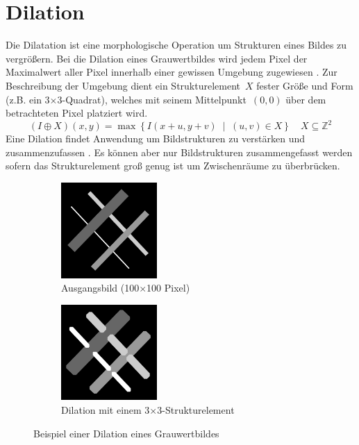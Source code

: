 \section{Dilation}
\writtenby{\dcauthornameewie}%
Die Dilatation ist eine morphologische Operation um Strukturen eines Bildes zu vergrößern.
Bei die Dilation eines Grauwertbildes wird jedem Pixel der Maximalwert aller Pixel innerhalb einer gewissen Umgebung zugewiesen \cite[3.5]{steinmueller2008}.
Zur Beschreibung der Umgebung dient ein Strukturelement~$X$ fester Größe und Form (z.B. ein 3$\times$3-Quadrat), welches mit seinem Mittelpunkt~$(0,0)$ über dem betrachteten Pixel platziert wird.
\begin{equation}
  (I\oplus X)(x,y)= \max \left\{ I(x+u,y+v) \;\middle|\; (u,v) \in X \right\} \quad X \subseteq \mathbb{Z}^2
\end{equation}
Eine Dilation findet Anwendung um Bildstrukturen zu verstärken und zusammenzufassen \cite[3.1]{steinmueller2008}.
Es können aber nur Bildstrukturen zusammengefasst werden sofern das Strukturelement groß genug ist um Zwischenräume zu überbrücken.

\begin{figure}[H]
  \label{fig:dilation}
  \centering
  \begin{subfigure}[t]{.49\linewidth}
    \centering
    \includegraphics[width=0.4\textwidth]{img/basics/dilation/before}
    \caption{Ausgangsbild (100$\times$100 Pixel)}
  \end{subfigure}
  \begin{subfigure}[t]{.49\linewidth}
    \centering
    \includegraphics[width=0.4\textwidth]{img/basics/dilation/after}
    \caption{Dilation mit einem 3$\times$3-Strukturelement}
  \end{subfigure}
  \caption{Beispiel einer Dilation eines Grauwertbildes}
\end{figure}
